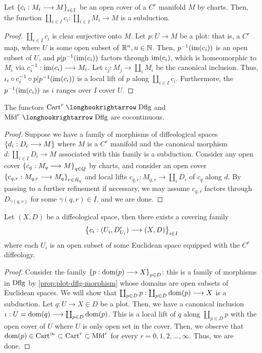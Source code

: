 \documentclass[11pt]{amsart}
\begin{document}
\begin{prop}\label{prop:Cr-man-op-cov-subd}
Let $\set{c_i : M_i \to M}_{i \in I}$ be an open cover of a $C^r$ manifold $M$ by charts.
Then, the function $\coprod_{i \in I} c_i : \coprod_{i \in I} M_i \to M$ is
a subduction.
\end{prop}
\begin{proof}
$\coprod_{i \in I} c_i$ is clear surjective onto $M$.
Let $p : U \to M$ be a plot: that is, a $C^r$ map, where $U$ is some open subset of
$\mathbb{R}^n, n \in \mathbb{N}$. Then, $p^{-1}(\mathrm{im}(c_i))$ is an open subset of $U$, and
$p|p^{-1}(\mathrm{im}(c_i))$ factors through $\mathrm{im}(c_i)$, which is homeomorphic to $M_i$ via
$c_i^{-1} : \im(c_i) \to M_i$. Let $\iota_j : M_j \to \coprod_i M_i$ be the canonical inclusion.
Thus, $\iota_i \circ c_i^{-1} \circ p|p^{-1}(\mathrm{im}(c_i))$ is a local
lift of $p$ along $\coprod_{i \in I} c_i$. Furthermore, the $p^{-1}(\mathrm{im}(c_i))$ as $i$ ranges over
$I$ cover $U$.
\end{proof}

\begin{prop}\label{prop:Cr-Dflg-cocont}
The functors $\Cart^r \hto \Dflg$ and $\Mfd^r \hto \Dflg$ are cocontinuous.
\end{prop}
\begin{proof}
Suppose we have a family of morphisms of diffeological spaces
$\set{d_i : D_i \to M}$ where $M$ is a $C^r$ manifold and the canonical morphism
$d : \coprod_{i \in I} D_i \to M$ associated with this family is a subduction.
Consider any open cover $\set{c_q : M_q \to M}_{q \in Q}$ by charts, and consider an open
cover $\set{c_{q, r} : M_{q, r} \to M_q}_{r \in R_q}$ and local
lifts $c_{q, r} : M_{q, r} \to \coprod_{i} D_i$ of $c_q$ along $d$.
By passing to a further refinement if necessary,
we may assume $c_{q, r}$ factors through $D_{\gamma(q, r)}$
for some $\gamma(q, r) \in I$, and we are done.
\end{proof}

\begin{prop}\label{prop:Dflg-cov-by-Cr}
Let $(X, D)$ be a diffeological space, then there exists a covering family
\[
\set{c_i : (U_i, D^r_{U_i}) \to (X, D)}_{i \in I}
\]
where each $U_i$ is an open subset of some Euclidean space equipped with the $C^r$ diffeology.
\end{prop}
\begin{proof}
Consider the family $\set{p : \dom(p) \to X}_{p \in D}$: this is a family of morphisms
in $\mathrm{Dflg}$ by \cref{prop:plot-dflg-morphism} whose domains are open subsets of
Euclidean spaces.
We will show that $\coprod_{p \in D} p : \coprod_{p \in D} \dom(p) \to X$ is a subduction.
Let $q : U \to X \in D$ be a plot. Then, we have a canonical inclusion
$\iota : U = \dom(q) \to \coprod_{p \in D} \dom(p)$. This is a local lift
of $q$ along $\coprod_{p \in D} p$ with the open cover of $U$ where $U$ is only open set
in the cover. Then, we observe that $\mathrm{dom}(p) \in \mathrm{Cart}^\infty \subset \mathrm{Cart}^r \subset \mathrm{Mfd}^r$
for every $r = 0, 1, 2, \dots, \infty$. Thus, we are done.
\end{proof}
\end{document}

